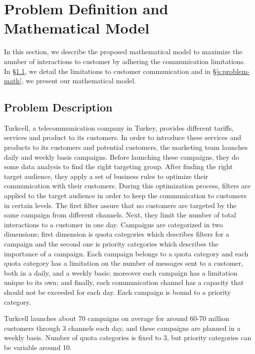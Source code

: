 \documentclass[11pt]{article}
\begin{document}
\section{Problem Definition and Mathematical Model}  \label{s:problemmodel}

In this section, we describe the proposed mathematical model to maximize the number of interactions to customer by adhering the communication limitations. In \S \ref{s:problem-desc}, we detail the limitations to customer communication and in \S \ref{s:problem-math}, we present our mathematical model.

\subsection{Problem Description} \label{s:problem-desc}

Turkcell, a telecommunication company in Turkey, provides different tariffs, services and product to its customers. In order to introduce these services and products to its customers and potential customers, the marketing team launches daily and weekly basis campaigns. Before launching these campaigns, they do some data analysis to find the right targeting group. After finding the right target audience, they apply a set of business rules to optimize their communication with their customers. During this optimization process, filters are applied to the target audience in order to keep the communication to customers in certain levels. The first filter assure that no customers are targeted by the same campaign from different channels. Next, they limit the number of total interactions to a customer in one day. Campaigns are categorized in two dimensions; first dimension is quota categories which describes filters for a campaign and the second one is priority categories which describes the importance of a campaign. Each campaign belongs to a quota category and each quota category has a limitation on the number of messages sent to a customer, both in a daily, and a weekly basis; moreover each campaign has a limitation unique to its own; and finally, each communication channel has a capacity that should not be exceeded for each day. Each campaign is bound to a priority category.

Turkcell launches about 70 campaigns on average for around 60-70 million customers through 3 channels each day, and these campaigns are planned in a weekly basis. Number of quota categories is fixed to 3, but priority categories can be variable around 10. 
\end{document}
